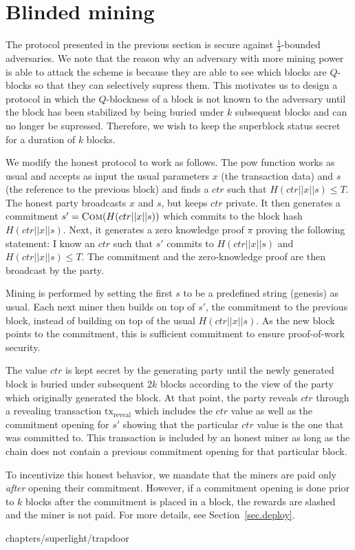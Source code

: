 \section{Blinded mining}

The protocol presented in the previous section is secure against
$\frac{1}{3}$-bounded adversaries. We note that the reason why an adversary with more
mining power is able to attack the scheme is because they are able to see which
blocks are $Q$-blocks so that they can selectively supress them. This motivates
us to design a protocol in which the $Q$-blockness of a block is not known to
the adversary until the block has been stabilized by being buried under $k$
subsequent blocks and can no longer be supressed. Therefore, we wish to keep
the superblock status secret for a duration of $k$ blocks.

We modify the honest protocol to work as follows. The \textsf{pow} function
works as usual and accepts as input the usual parameters $x$ (the transaction
data) and $s$ (the reference to the previous block) and finds a $ctr$ such that
$H(ctr || x || s) \leq T$. The honest party broadcasts $x$ and $s$, but keeps
$ctr$ private. It then generates a commitment $s' = \textsc{Com}(H(ctr || x ||
s))$ which commits to the block hash $H(ctr || x || s)$. Next, it generates a
zero knowledge proof $\pi$ proving the following statement: I know an $ctr$ such
that $s'$ commits to $H(ctr || x || s)$  and $H(ctr || x || s) \leq T$. The
commitment and the zero-knowledge proof are then broadcast by the party.

Mining is performed by setting the first $s$ to be a predefined string (genesis)
as usual. Each next miner then builds on top of $s'$, the commitment to the
previous block, instead of building on top of the usual $H(ctr || x || s)$. As
the new block points to the commitment, this is sufficient commitment to ensure
proof-of-work security.

The value $ctr$ is kept secret by the generating party until the newly generated
block is buried under subsequent $2k$ blocks according to the view of the party
which originally generated the block. At that point, the party reveals $ctr$
through a revealing transaction $\text{tx}_\text{reveal}$ which includes the
$ctr$ value as well as the commitment opening for $s'$ showing that the
particular $ctr$ value is the one that was committed to. This transaction is
included by an honest miner as long as the chain does not contain a previous
commitment opening for that particular block.

To incentivize this honest behavior, we mandate that the miners are paid only
\emph{after} opening their commitment. However, if a commitment opening is done
prior to $k$ blocks after the commitment is placed in a block, the rewards are
slashed and the miner is not paid. For more details, see
Section~\ref{sec.deploy}.

{chapters/superlight/trapdoor}
